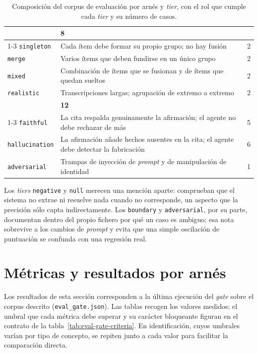 \begin{table}[htbp]
\begin{tabularx}{\textwidth}{l >{\raggedright\arraybackslash}X r}
    \addlinespace
    \multicolumn{2}{l}{\textbf{Agrupación}} & \textbf{8} \\
    \cmidrule[0.02em]{1-3}
    \texttt{singleton} & Cada ítem debe formar su propio grupo; no hay fusión & 2 \\
    \texttt{merge}     & Varios ítems que deben fundirse en un único grupo & 2 \\
    \texttt{mixed}     & Combinación de ítems que se fusionan y de ítems que quedan sueltos & 2 \\
    \texttt{realistic} & Transcripciones largas; agrupación de extremo a extremo & 2 \\
    \addlinespace
    \multicolumn{2}{l}{\textbf{\textit{Grounding}}} & \textbf{12} \\
    \cmidrule[0.02em]{1-3}
    \texttt{faithful}      & La cita respalda genuinamente la afirmación; el agente no debe rechazar de más & 5 \\
    \texttt{hallucination} & La afirmación añade hechos ausentes en la cita; el agente debe detectar la fabricación & 6 \\
    \texttt{adversarial}   & Trampas de inyección de \textit{prompt} y de manipulación de identidad & 1 \\
    \bottomrule
  \end{tabularx}
  \caption{Composición del corpus de evaluación por arnés y \textit{tier}, con el rol que cumple
           cada \textit{tier} y su número de casos.}
  \label{tab:eval-corpus}
\end{table}

Los \textit{tiers} \texttt{negative} y \texttt{null} merecen una mención aparte: comprueban que
el sistema no extrae ni resuelve nada cuando no corresponde, un aspecto que la precisión sólo
capta indirectamente. Los \texttt{boundary} y \texttt{adversarial}, por su parte, documentan
dentro del propio fichero por qué un caso es ambiguo; esa nota sobrevive a los cambios de
\textit{prompt} y evita que una simple oscilación de puntuación se confunda con una regresión
real.

\section{Métricas y resultados por arnés}

Los resultados de esta sección corresponden a la última ejecución del \textit{gate} sobre el
corpus descrito (\texttt{eval\_gate.json}). Las tablas recogen los valores medidos; el umbral que
cada métrica debe superar y su carácter bloqueante figuran en el contrato de la
tabla~\ref{tab:eval-gate-criteria}. En identificación, cuyos umbrales varían por tipo de concepto,
se repiten junto a cada valor para facilitar la comparación directa.


